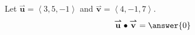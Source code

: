 \documentclass{ximera}
\author{Gregory Hartman \and Matthew Carr}
\begin{document}
\begin{exercise}
Let $\overset{\boldsymbol{\rightharpoonup}}{\mathbf{u}} = \left< 3,5,-1 \right>$ and $\overset{\boldsymbol{\rightharpoonup}}{\mathbf{v}} = \left< 4,-1,7 \right>$.
\[
\overset{\boldsymbol{\rightharpoonup}}{\mathbf{u}} \bullet \overset{\boldsymbol{\rightharpoonup}}{\mathbf{v}} = \answer{0}
\]
\end{exercise}
\end{document}
